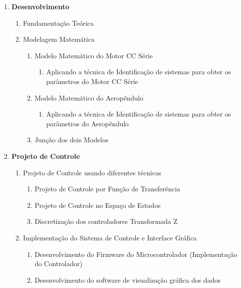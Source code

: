 \documentclass[12pt,oneside,a4paper,brazil]{article}
\begin{document}
\begin{enumerate}
		\item \textbf{Desenvolvimento}
		\begin{enumerate}
			\item Fundamentação Teórica
			\item Modelagem Matemática
			\begin{enumerate}
				\item Modelo Matemático do Motor CC Série
					\begin{enumerate}
					\item Aplicando a técnica de Identificação de sistemas para obter os parâmetros do Motor CC Série
					\end{enumerate}
				\item Modelo Matemático do Aeropêndulo
					\begin{enumerate}
						\item Aplicando a técnica de Identificação de sistemas para obter os parâmetros do Aeropêndulo
					\end{enumerate}
				\item Junção dos dois Modelos
			\end{enumerate}
			

		\end{enumerate}
	
		\item \textbf{Projeto de Controle}
			\begin{enumerate}
			\item Projeto de Controle usando diferentes técnicas
			\begin{enumerate}
				\item Projeto de Controle por Função de Transferência
				\item Projeto de Controle no Espaço de Estados
				\item Discretização dos controladores Transformada Z
			\end{enumerate}
			
			
			\item Implementação do Sistema de Controle e Interface Gráfica
			\begin{enumerate}
				\item Desenvolvimento do Firmware do Microcontrolador (Implementação do Controlador)
				\item Desenvolvimento do software de visualização gráfica dos dados
			\end{enumerate}
			\end{enumerate}
		

\end{enumerate}
\end{document}
